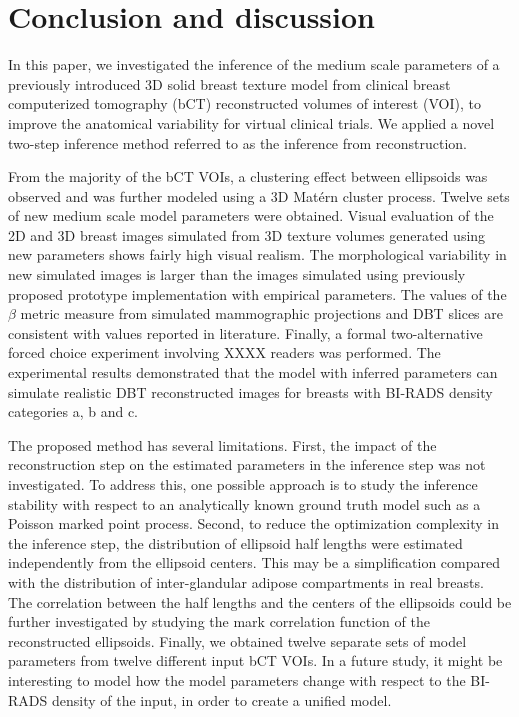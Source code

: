 \documentclass[journal]{IEEEtran}
\begin{document}
\section{Conclusion and discussion}
\label{sec:concl-disc}

In this paper, we investigated the inference of the medium scale
parameters of a previously introduced 3D solid breast texture model
from clinical breast computerized tomography (bCT) reconstructed
volumes of interest (VOI), to improve the anatomical variability for
virtual clinical trials. We applied a novel two-step inference method
referred to as the inference from reconstruction.

From the majority of the bCT VOIs, a clustering effect between
ellipsoids was observed and was further modeled using a 3D Mat\'{e}rn
cluster process. Twelve sets of new medium scale model parameters were
obtained. Visual evaluation of the 2D and 3D breast images simulated
from 3D texture volumes generated using new parameters shows fairly
high visual realism. The morphological variability in new simulated
images is larger than the images simulated using previously proposed
prototype implementation with empirical parameters. The values of the
$\beta$ metric measure from simulated mammographic projections and DBT
slices are consistent with values reported in literature. Finally, a
formal two-alternative forced choice experiment involving XXXX readers
was performed. The experimental results demonstrated that the model
with inferred parameters can simulate realistic DBT reconstructed
images for breasts with BI-RADS density categories a, b and c.

The proposed method has several limitations. First, the impact of the
reconstruction step on the estimated parameters in the inference step
was not investigated. To address this, one possible approach is to
study the inference stability with respect to an analytically known
ground truth model such as a Poisson marked point process. Second, to
reduce the optimization complexity in the inference step, the
distribution of ellipsoid half lengths were estimated independently
from the ellipsoid centers. This may be a simplification compared with
the distribution of inter-glandular adipose compartments in real
breasts. The correlation between the half lengths and the centers of
the ellipsoids could be further investigated by studying the mark
correlation function of the reconstructed ellipsoids. Finally, we
obtained twelve separate sets of model parameters from twelve
different input bCT VOIs. In a future study, it might be interesting
to model how the model parameters change with respect to the BI-RADS
density of the input, in order to create a unified model.
\end{document}
